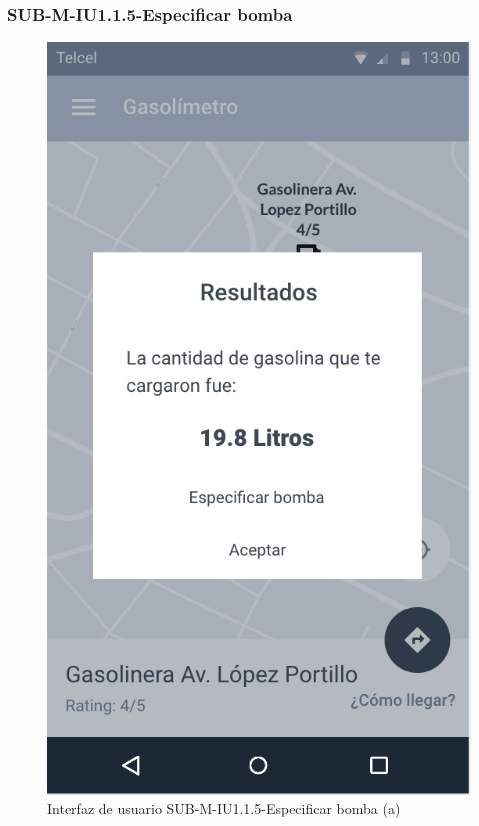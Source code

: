 \subsubsection{SUB-M-IU1.1.5-Especificar bomba}\label{SUB-M-IU1.1.5}
\begin{figure}[H]
	\centering
	\includegraphics[scale=.55]{Capitulo4/software/submodulos/mediciones/images/sub-m-iu1_1_5_a}
	\caption{Interfaz de usuario SUB-M-IU1.1.5-Especificar bomba (a)}
	\label{fig:sub-m-iu1.1.5.a}
\end{figure}
